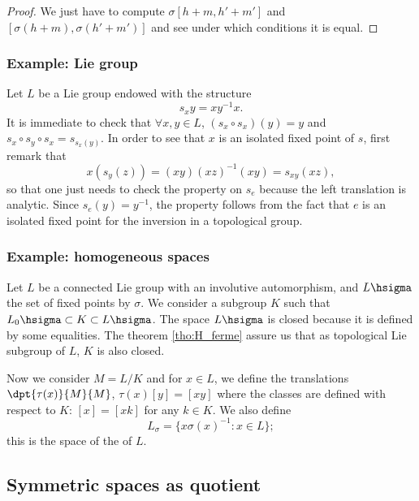 \begin{proof}
We just have to compute $\sigma[h+m,h'+m']$ and $[\sigma(h+m),\sigma(h'+m')]$ and see under which conditions it is equal.
\end{proof}

\subsubsection{Example: Lie group}

Let $L$ be a Lie group endowed with the structure
\begin{equation}
  s_xy=xy^{-1} x.
\end{equation}
It is immediate to check that $\forall x,y\in L$,  $(s_x\circ s_x)(y)=y$ and $s_x\circ s_y\circ s_x=s_{s_x(y)}$. In order to see that $x$ is an isolated fixed point of $s$, first remark that 
\[
    x(s_y(z))=(xy)(xz)^{-1}(xy)=s_{xy}(xz),
\]
so that one just needs to check the property on $s_e$ because the left translation is analytic. Since $s_e(y)=y^{-1}$, the property follows from the fact that $e$ is an isolated fixed point for the inversion in a topological group.

\subsubsection{Example: homogeneous spaces}

Let $L$ be a connected Lie group with an involutive automorphism, and $L\hsigma$ the set of fixed points by $\sigma$. We consider a subgroup $K$ such that $L_0\hsigma\subset K\subset L\hsigma$. The space $L\hsigma$ is closed because it is defined by some equalities. The theorem \ref{tho:H_ferme} assure us that as topological Lie subgroup of $L$, $K$ is also closed.
 
Now we consider $M=L/K$ and for $x\in L$, we define the translations $\dpt{\tau(x)}{M}{M}$, $\tau(x)[y]=[xy]$ where the classes are defined with respect to $K$: $[x]=[xk]$ for any $k\in K$. We also define
\begin{equation}
   L_{\sigma}=\{ x\sigma(x)^{-1}:x\in L \};
\end{equation}
this is the space of the  of $L$.



\subsection{Symmetric spaces as quotient}

